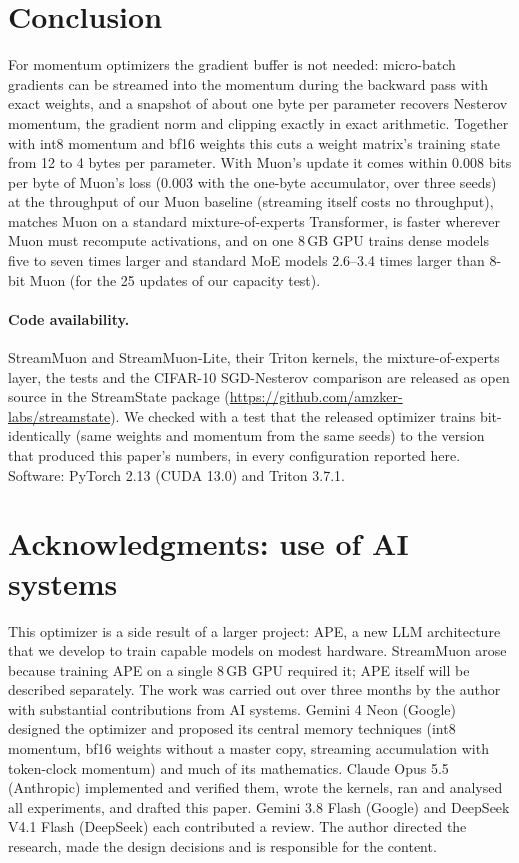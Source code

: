 \documentclass[10pt]{article}
\newcommand{\method}{StreamMuon}\newcommand{\lite}{StreamMuon-Lite}
\begin{document}
\section{Conclusion}
For momentum optimizers the gradient buffer is not needed: micro-batch gradients can be streamed into the momentum
during the backward pass with exact weights, and a snapshot of about one byte per parameter recovers Nesterov momentum, the gradient
norm and clipping exactly in exact arithmetic. Together with int8 momentum and bf16 weights this cuts a weight matrix's training
state from 12 to 4 bytes per parameter. With Muon's update it comes within 0.008 bits per byte of Muon's loss (0.003 with the one-byte accumulator, over
three seeds) at the throughput of our Muon baseline (streaming itself costs no throughput), matches Muon on a standard mixture-of-experts Transformer, is
faster wherever Muon must recompute activations, and on one
8\,GB GPU trains dense models five to seven times larger and standard MoE models 2.6--3.4 times larger than 8-bit
Muon (for the 25 updates of our capacity test).

\paragraph{Code availability.} \method{} and \lite{}, their Triton kernels, the mixture-of-experts layer, the tests and
the CIFAR-10 SGD-Nesterov comparison are released as open source in the StreamState package
(\url{https://github.com/amzker-labs/streamstate}). We checked with a test that the released optimizer trains
bit-identically (same weights and momentum from the same seeds) to the version that produced this paper's numbers,
in every configuration reported here. Software: PyTorch 2.13 (CUDA 13.0) and Triton 3.7.1.

\section*{Acknowledgments: use of AI systems}
This optimizer is a side result of a larger project: APE, a new LLM architecture that we develop to train capable
models on modest hardware. StreamMuon arose because training APE on a single 8\,GB GPU required it; APE itself will be
described separately. The work was carried out over three months by the author with substantial contributions from AI
systems. Gemini 4 Neon (Google) designed the optimizer and proposed its central memory techniques (int8 momentum, bf16
weights without a master copy, streaming accumulation with token-clock momentum) and much of its mathematics. Claude
Opus 5.5 (Anthropic) implemented and verified them, wrote the kernels, ran and analysed all experiments, and drafted
this paper. Gemini 3.8 Flash (Google) and DeepSeek V4.1 Flash (DeepSeek) each contributed a review. The author directed
the research, made the design decisions and is responsible for the content.
\end{document}
